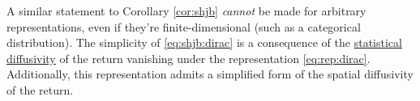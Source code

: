 %
%
%
%
%

\begin{remark}
  A similar statement to Corollary \ref{cor:shjb} \emph{cannot} be
  made for arbitrary representations, even if they're finite-dimensional (such
  as a categorical distribution). The simplicity of \eqref{eq:shjb:dirac} is a
  consequence of the \hyperref[def:diffusivity]{statistical diffusivity} of the
  return vanishing under the representation \eqref{eq:rep:dirac}. Additionally,
  this representation admits a simplified form of the spatial diffusivity of the
  return.
\end{remark}

